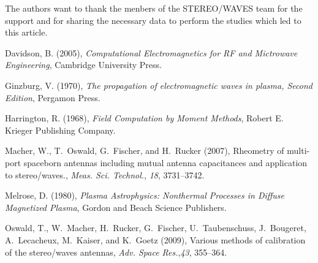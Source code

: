 \documentclass[draft,ras]{agutex}
\begin{document}
\begin{article}
\begin{acknowledgments}
The authors want to thank the menbers of the STEREO/WAVES team for the support and for sharing the necessary data to perform the studies which led to this article.
\end{acknowledgments}

%
%
%
%
%
%
%
%
%
%

\begin{thebibliography}{}
Davidson, B. (2005), \textit{Computational Electromagnetics for RF and
  Mictrowave Engineering}, Cambridge University Press.

Ginzburg, V. (1970), \textit{The propagation of electromagnetic waves in
  plasma, Second Edition}, Pergamon Press.

Harrington, R. (1968), \textit{Field Computation by Moment Methods}, Robert E.
  Krieger Publishing Company.

Macher, W., T.~Oswald, G.~Fischer, and H.~Rucker (2007), Rheometry of
  multi-port spaceborn antennas including mutual antenna capacitances and
  application to stereo/waves., \textit{Meas. Sci. Technol.}, \textit{18},
  3731--3742.

Melrose, D. (1980), \textit{Plasma Astrophysics: Nonthermal Processes in
  Diffuse Magnetized Plasma}, Gordon and Beach Science Publishers.

Oswald, T., W.~Macher, H.~Rucker, G.~Fischer, U.~Taubenschuss, J.~Bougeret,
  A.~Lecacheux, M.~Kaiser, and K.~Goetz (2009), Various methods of calibration
  of the stereo/waves antennas, \textit{Adv. Space Res.},\textit{43},
  355--364.


\end{thebibliography}
\end{article}
\end{document}
